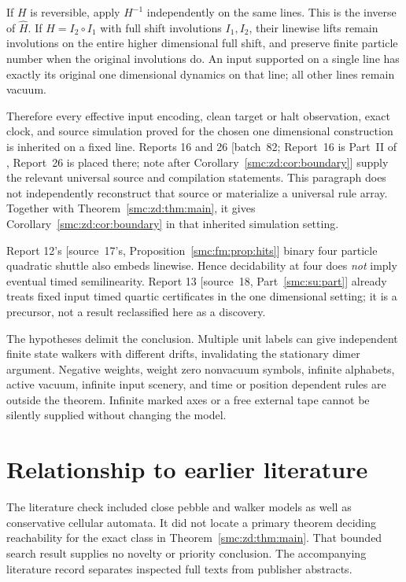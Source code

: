 \documentclass[11pt,letterpaper]{article}
\numberwithin{equation}{section}
\theoremstyle{definition}
\theoremstyle{remark}
\begin{document}
If $H$ is reversible, apply $H^{-1}$ independently on the same lines. This is the inverse of $\widehat H$. If $H=I_2\circ I_1$ with full shift involutions $I_1,I_2$, their linewise lifts remain involutions on the entire higher dimensional full shift, and preserve finite particle number when the original involutions do. An input supported on a single line has exactly its original one dimensional dynamics on that line; all other lines remain vacuum.

Therefore every effective input encoding, clean target or halt observation, exact clock, and source simulation proved for the chosen one dimensional construction is inherited on a fixed line. Reports 16 and 26 \textup{[batch~82; Report~16 is Part~II of , Report~26 is placed there; note after Corollary~\ref{smc:zd:cor:boundary}]} supply the relevant universal source and compilation statements. This paragraph does not independently reconstruct that source or materialize a universal rule array. Together with Theorem~\ref{smc:zd:thm:main}, it gives Corollary~\ref{smc:zd:cor:boundary} in that inherited simulation setting.

Report 12's \textup{[source~17's, Proposition~\ref{smc:fm:prop:hits}]} binary four particle quadratic shuttle also embeds linewise. Hence decidability at four does \emph{not} imply eventual timed semilinearity. Report 13 \textup{[source~18, Part~\ref{smc:su:part}]} already treats fixed input timed quartic certificates in the one dimensional setting; it is a precursor, not a result reclassified here as a discovery.

The hypotheses delimit the conclusion. Multiple unit labels can give independent finite state walkers with different drifts, invalidating the stationary dimer argument. Negative weights, weight zero nonvacuum symbols, infinite alphabets, active vacuum, infinite input scenery, and time or position dependent rules are outside the theorem. Infinite marked axes or a free external tape cannot be silently supplied without changing the model.

\section{Relationship to earlier literature}\label{smc:zd:sec:literature}
The literature check included close pebble and walker models as well as conservative cellular automata. It did not locate a primary theorem deciding reachability for the exact class in Theorem~\ref{smc:zd:thm:main}. That bounded search result supplies no novelty or priority conclusion. The accompanying literature record separates inspected full texts from publisher abstracts.
\end{document}
